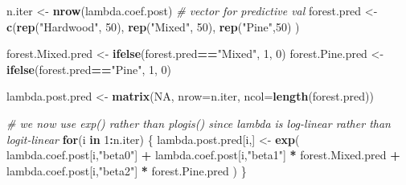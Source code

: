 \documentclass[
]{article}
\newenvironment{Shaded}{\begin{snugshade}}{\end{snugshade}}
\newcommand{\AttributeTok}[1]{\textcolor[rgb]{0.13,0.29,0.53}{#1}}
\newcommand{\CommentTok}[1]{\textcolor[rgb]{0.56,0.35,0.01}{\textit{#1}}}
\newcommand{\ConstantTok}[1]{\textcolor[rgb]{0.56,0.35,0.01}{#1}}
\newcommand{\ControlFlowTok}[1]{\textcolor[rgb]{0.13,0.29,0.53}{\textbf{#1}}}
\newcommand{\DecValTok}[1]{\textcolor[rgb]{0.00,0.00,0.81}{#1}}
\newcommand{\FunctionTok}[1]{\textcolor[rgb]{0.13,0.29,0.53}{\textbf{#1}}}
\newcommand{\NormalTok}[1]{#1}
\newcommand{\OtherTok}[1]{\textcolor[rgb]{0.56,0.35,0.01}{#1}}
\newcommand{\SpecialCharTok}[1]{\textcolor[rgb]{0.81,0.36,0.00}{\textbf{#1}}}
\newcommand{\StringTok}[1]{\textcolor[rgb]{0.31,0.60,0.02}{#1}}
\begin{document}
\begin{Shaded}
\begin{Highlighting}[]
\NormalTok{n.iter }\OtherTok{\textless{}{-}} \FunctionTok{nrow}\NormalTok{(lambda.coef.post)}
\CommentTok{\# vector for predictive val}
\NormalTok{forest.pred }\OtherTok{\textless{}{-}} \FunctionTok{c}\NormalTok{(}\FunctionTok{rep}\NormalTok{(}\StringTok{"Hardwood"}\NormalTok{, }\DecValTok{50}\NormalTok{),}
                 \FunctionTok{rep}\NormalTok{(}\StringTok{"Mixed"}\NormalTok{, }\DecValTok{50}\NormalTok{),}
                 \FunctionTok{rep}\NormalTok{(}\StringTok{"Pine"}\NormalTok{,}\DecValTok{50}\NormalTok{)}
\NormalTok{                 )}

\NormalTok{forest.Mixed.pred }\OtherTok{\textless{}{-}} \FunctionTok{ifelse}\NormalTok{(forest.pred}\SpecialCharTok{==}\StringTok{"Mixed"}\NormalTok{, }\DecValTok{1}\NormalTok{, }\DecValTok{0}\NormalTok{)}
\NormalTok{forest.Pine.pred }\OtherTok{\textless{}{-}} \FunctionTok{ifelse}\NormalTok{(forest.pred}\SpecialCharTok{==}\StringTok{"Pine"}\NormalTok{, }\DecValTok{1}\NormalTok{, }\DecValTok{0}\NormalTok{)}

\NormalTok{lambda.post.pred }\OtherTok{\textless{}{-}} \FunctionTok{matrix}\NormalTok{(}\ConstantTok{NA}\NormalTok{, }\AttributeTok{nrow=}\NormalTok{n.iter, }\AttributeTok{ncol=}\FunctionTok{length}\NormalTok{(forest.pred))}

\CommentTok{\# we now use exp() rather than plogis() since lambda is log{-}linear rather than logit{-}linear}
\ControlFlowTok{for}\NormalTok{(i }\ControlFlowTok{in} \DecValTok{1}\SpecialCharTok{:}\NormalTok{n.iter) \{}
\NormalTok{    lambda.post.pred[i,] }\OtherTok{\textless{}{-}} \FunctionTok{exp}\NormalTok{(}
\NormalTok{      lambda.coef.post[i,}\StringTok{"beta0"}\NormalTok{] }\SpecialCharTok{+} 
\NormalTok{      lambda.coef.post[i,}\StringTok{"beta1"}\NormalTok{] }\SpecialCharTok{*}\NormalTok{ forest.Mixed.pred }\SpecialCharTok{+} 
\NormalTok{      lambda.coef.post[i,}\StringTok{"beta2"}\NormalTok{] }\SpecialCharTok{*}\NormalTok{ forest.Pine.pred}
\NormalTok{      )}
\NormalTok{\}}


\end{Highlighting}
\end{Shaded}
\end{document}
